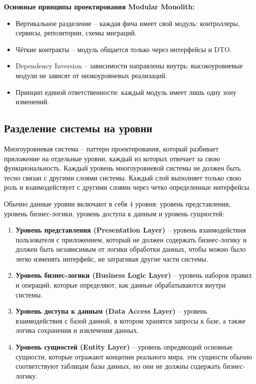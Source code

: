 \documentclass[a4paper,12pt]{report}
\begin{document}
\textbf{Основные принципы проектирования Modular Monolith:}
\begin{itemize}
    \item
        Вертикальное разделение -- каждая фича имеет свой модуль: контроллеры, сервисы, репозитории, схемы миграций.
    \item
        Чёткие контракты -- модуль общается только через интерфейсы и DTO.
    \item
        Dependency Inversion -- зависимости направлены внутрь: высокоуровневые модули не зависят от низкоуровневых реализаций.
    \item
        Принцип единой ответственности: каждый модуль имеет лишь одну зону изменений.
\end{itemize}

\subsection{Разделение системы на уровни}

Многоуровневая система -- паттерн проектирования, который разбивает приложение на отдельные уровни, каждый из которых отвечает 
за свою функциональность. Каждый уровень многоуровневой системы не должен быть тесно связан с другими слоями системы. Каждый слой 
выполняет только свою роль и взаимодействует с другими слоями через четко определенные интерфейсы.

Обычно данные уровни включают в себя 4 уровня: уровень представления, уровень бизнес-логики, уровень доступа к данным и 
уровень сущностей:
\begin{enumerate}
    \item
        \textbf{Уровень представления (Presentation Layer)} -- уровень взаимодействия пользователя с приложением, 
        который не должен содержать бизнес-логику и должен быть независимым от логики обработки данных, 
        чтобы можно было легко изменять интерфейс, не затрагивая другие части системы.
    \item
        \textbf{Уровень бизнес-логики (Business Logic Layer)} -- уровень наборов правил и операций, которые определяют,
        как данные обрабатываются внутри системы.
    \item
        \textbf{Уровень доступа к данным (Data Access Layer)} -- уровень взаимодействия с базой данной, 
        в котором хранятся запросы к базе, а также логика сохранения и извлечения данных.
    \item
        \textbf{Уровень сущностей (Entity Layer)} -- уровень опредяющий основные сущности, которые отражают концепии реального 
        мира, эти сущности обычно соответствуют таблицам базы данных, но они не должны содержать бизнес-логику.
\end{enumerate}
\end{document}
